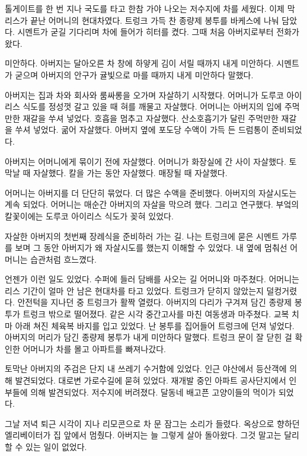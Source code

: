 \documentclass[a5paper,10pt, twoside, openright]{memoir}
\begin{document}
	톨게이트를 한 번 지나 국도를 타고 한참 가야 나오는 저수지에 차를 세웠다. 이제 막 리스가 끝난 어머니의 현대차였다. 트렁크 가득 찬 종량제 봉투를 바케스에 나눠 담았다. 시멘트가 굳길 기다리며 차에 들어가 히터를 켰다. 그때 처음 아버지로부터 전화가 왔다.

	미안하다. 아버지는 달아오른 차 창에 하얗게 김이 서릴 때까지 내게 미안하다. 시멘트가 굳으며 아버지의 안구가 귤빛으로 마를 때까지 내게 미안하다 말했다.

	아버지는 집과 차와 회사와 룸싸롱을 오가며 자살하기 시작했다. 어머니가 도루코 아이리스 식도를 정성껏 갈고 있을 때 혀를 깨물고 자살했다. 어머니는 아버지의 입에 주먹만한 재갈을 쑤셔 넣었다. 호흡을 멈추고 자살했다. 산소호흡기가 달린 주먹만한 재갈을 쑤셔 넣었다. 굶어 자살했다. 아버지 옆에 포도당 수액이 가득 든 드럼통이 준비되었다.

	아버지는 어머니에게 묶이기 전에 자살했다. 어머니가 화장실에 간 사이 자살했다. 토막날 때 자살했다. 칼을 가는 동안 자살했다. 매장될 때 자살했다.

	어머니는 아버지를 더 단단히 묶었다. 더 많은 수액을 준비했다. 아버지의 자살시도는 계속 되었다. 어머니는 매순간 아버지의 자살을 막으려 했다. 그리고 연구했다. 부엌의 칼꽃이에는 도루코 아이리스 식도가 꽂혀 있었다.

	자살한 아버지의 첫번째 장례식을 준비하러 가는 길. 나는 트렁크에 묻은 시멘트 가루를 보며 그 동안 아버지가 왜 자살시도를 했는지 이해할 수 있었다. 내 옆에 멈춰선 어머니는 습관처럼 흐느꼈다.

	언젠가 이런 일도 있었다. 수퍼에 들러 담배를 사오는 길 어머니와 마주쳤다. 어머니는 리스 기간이 얼마 안 남은 현대차를 타고 있었다. 트렁크가 닫히지 않았는지 덜컹거렸다. 안전턱을 지나던 중 트렁크가 활짝 열렸다. 아버지의 다리가 구겨져 담긴 종량제 봉투가 트렁크 밖으로 떨어졌다. 같은 시각 중간고사를 마친 여동생과 마주쳤다. 교복 치마 아래 쳐진 체육복 바지를 입고 있었다. 난 봉투를 집어들어 트렁크에 던져 넣었다. 아버지의 머리가 담긴 종량제 봉투가 내게 미안하다 말했다. 트렁크 문이 잘 닫힌 걸 확인한 어머니가 차를 몰고 아파트를 빠져나갔다.

	토막난 아버지의 주검은 단지 내 쓰레기 수거함에 있었다. 인근 야산에서 등산객에 의해 발견되었다. 대로변 가로수길에 묻혀 있었다. 재개발 중인 아파트 공사단지에서 인부들에 의해 발견되었다. 저수지에 버려졌다. 달동네 배고픈 고양이들의 먹이가 되었다.

	그날 저녁 퇴근 시각이 지나 리모콘으로 차 문 잠그는 소리가 들렸다. 옥상으로 향하던 엘리베이터가 집 앞에서 멈췄다. 아버지는 늘 그렇게 살아 돌아왔다. 그것 말고는 달리 할 수 있는 일이 없었다.
\end{document}
